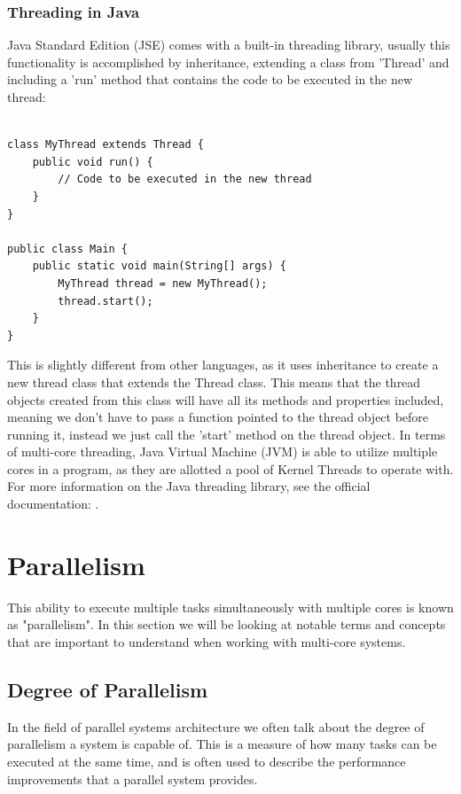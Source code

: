 \documentclass[12pt,a4paper]{article}
\begin{document}
\subsubsection{Threading in Java}

Java Standard Edition (JSE) comes with a built-in threading library\parencite{JavaThreadClass}, usually this functionality is accomplished by inheritance, extending a class from 'Thread' and including a 'run' method that contains the code to be executed in the new thread:

\begin{verbatim}

class MyThread extends Thread {
    public void run() {
        // Code to be executed in the new thread
    }
}

public class Main {
    public static void main(String[] args) {
        MyThread thread = new MyThread();
        thread.start();
    }
}
\end{verbatim}

This is slightly different from other languages, as it uses inheritance to create a new thread class that extends the Thread class. This means that the thread objects created from this class will have all its methods and properties included, meaning we don't have to pass a function pointed to the thread object before running it, instead we just call the 'start' method on the thread object. In terms of multi-core threading, Java Virtual Machine (JVM) is able to utilize multiple cores in a program, as they are allotted a pool of Kernel Threads to operate with. For more information on the Java threading library, see the official documentation: .

\section{Parallelism}

This ability to execute multiple tasks simultaneously with multiple cores is known as "parallelism". In this section we will be looking at notable terms and concepts that are important to understand when working with multi-core systems.

\subsection{Degree of Parallelism}

In the field of parallel systems architecture we often talk about the degree of parallelism a system is capable of. This is a measure of how many tasks can be executed at the same time, and is often used to describe the performance improvements that a parallel system provides.
\end{document}
